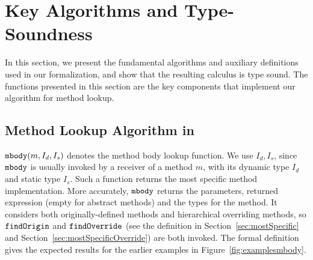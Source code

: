 \section{Key Algorithms and Type-Soundness}\label{sec:auxdefs}
In this section, we present the fundamental algorithms and auxiliary
definitions used in our formalization, and show that the resulting
calculus is type sound. The functions presented in this section are
the key components that implement our algorithm for method lookup.

\subsection{Method Lookup Algorithm in \mbody{}}\label{subsec:mbodydef}

$\texttt{mbody}(m, I_d, I_s)$ denotes the method body lookup function.
We use $I_d, I_s$, since $\texttt{mbody}$ is usually invoked by a receiver of a method $m$, with its dynamic type $I_d$ and static type $I_s$. Such a function returns the most specific method implementation. More
accurately, $\texttt{mbody}$ returns the parameters, returned expression
(empty for abstract methods) and the types for the method. It considers both originally-defined methods and hierarchical overriding methods, so $\texttt{findOrigin}$ and $\texttt{findOverride}$ (see the definition in Section~\ref{sec:mostSpecific} and Section~\ref{sec:mostSpecificOverride}) are both invoked.
 The formal definition gives the expected results
for the earlier examples in Figure~\ref{fig:examplesmbody}.


